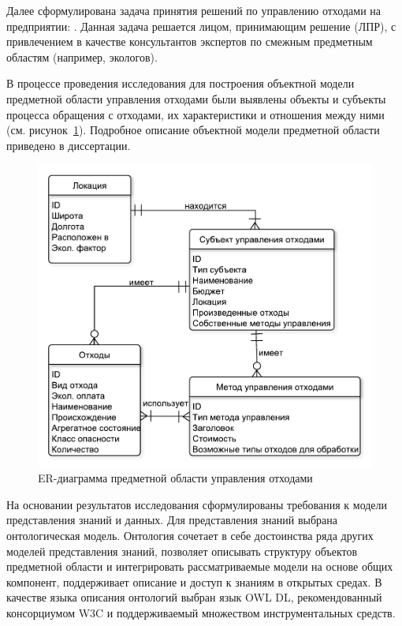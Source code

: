 \documentclass[a4paper]{G2-105}
\begin{document}
Далее сформулирована задача принятия решений по управлению отходами на предприятии: \CommonTprFormulaCompact. Данная задача решается лицом, принимающим решение (ЛПР), с привлечением в качестве консультантов экспертов по смежным предметным областям (например, экологов).

В процессе проведения исследования для построения объектной модели предметной области управления отходами были выявлены объекты и субъекты процесса обращения с отходами, их характеристики и отношения между ними (см. рисунок~\ref{fig:er}). Подробное описание объектной модели предметной области приведено в диссертации.

\begin{figure}[H]
\centering
\includegraphics[scale=0.6]{er}
\caption{ER-диаграмма предметной области управления отходами}
\label{fig:er}
\end{figure}

На основании результатов исследования сформулированы требования к модели представления знаний и данных. Для представления знаний выбрана онтологическая модель. Онтология сочетает в себе достоинства ряда других моделей представления знаний, позволяет описывать структуру объектов предметной области и интегрировать рассматриваемые модели на основе общих компонент, поддерживает описание и доступ к знаниям в открытых средах. В качестве языка описания онтологий выбран язык OWL DL, рекомендованный консорциумом W3C и поддерживаемый множеством инструментальных средств.
\end{document}
